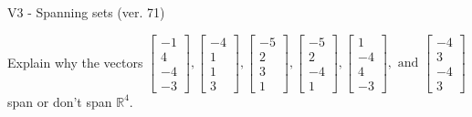 \begin{exercise}
  \begin{exerciseTitle}V3 - Spanning sets (ver. 71)\end{exerciseTitle}
  \begin{exerciseStatement}
    Explain why the vectors \(\left[\begin{array}{r}
-1 \\
4 \\
-4 \\
-3
\end{array}\right] , \left[\begin{array}{r}
-4 \\
1 \\
1 \\
3
\end{array}\right] , \left[\begin{array}{r}
-5 \\
2 \\
3 \\
1
\end{array}\right] , \left[\begin{array}{r}
-5 \\
2 \\
-4 \\
1
\end{array}\right] , \left[\begin{array}{r}
1 \\
-4 \\
4 \\
-3
\end{array}\right] , \text{ and } \left[\begin{array}{r}
-4 \\
3 \\
-4 \\
3
\end{array}\right]\) span or don't span \(\mathbb{R}^4\). 
	



\end{exerciseStatement}
\end{exercise}
